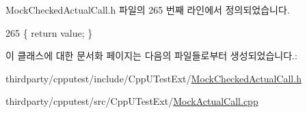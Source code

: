 Mock\+Checked\+Actual\+Call.\+h 파일의 265 번째 라인에서 정의되었습니다.


\begin{DoxyCode}
265 \{ \textcolor{keywordflow}{return} value; \}
\end{DoxyCode}


이 클래스에 대한 문서화 페이지는 다음의 파일들로부터 생성되었습니다.\+:\begin{DoxyCompactItemize}
\item 
thirdparty/cpputest/include/\+Cpp\+U\+Test\+Ext/\hyperlink{_mock_checked_actual_call_8h}{Mock\+Checked\+Actual\+Call.\+h}\item 
thirdparty/cpputest/src/\+Cpp\+U\+Test\+Ext/\hyperlink{_mock_actual_call_8cpp}{Mock\+Actual\+Call.\+cpp}\end{DoxyCompactItemize}

